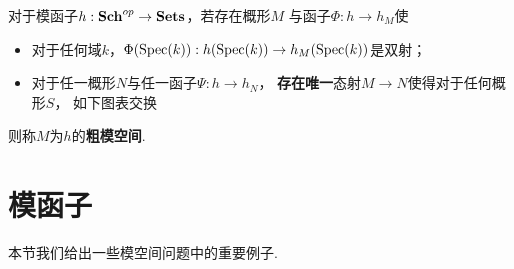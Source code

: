     \begin{definition}
        对于模函子$h:\mathbf{Sch}^{op} \to \mathbf{Sets}$，若存在概形$M$
        与函子$\Phi:h \to h_{M}$使
        \begin{itemize}
            \item[(a)]
            对于任何域$k$，$\Phi(\operatorname{Spec}(k)): h(\operatorname{Spec}(k)) \to h_{M}(\operatorname{Spec}(k))$是双射；

            \item[(b)]
            对于任一概形$N$与任一函子$\Psi:h \to h_{N}$，
            \textbf{存在唯一}态射$M \to N$使得对于任何概形$S$，
            如下图表交换
            \begin{center}
            \end{center}
        \end{itemize}
        则称$M$为$h$的\textbf{粗模空间}.
    \end{definition}

\section{模函子}
    本节我们给出一些模空间问题中的重要例子.
